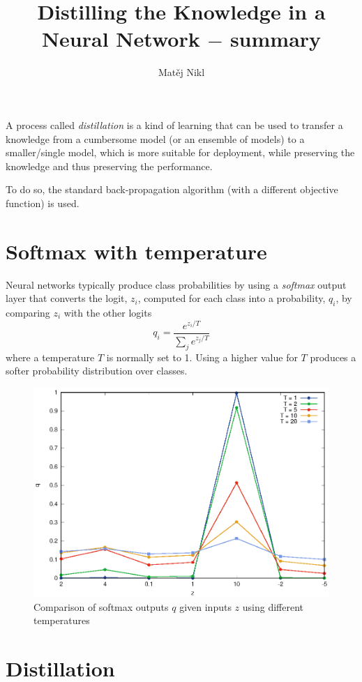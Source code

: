 \documentclass[a4paper,twocolumn]{article}
\title{Distilling the Knowledge in a Neural Network $-$ summary}
\author{Matěj Nikl}
\begin{document}
\maketitle
A process called \textit{distillation} is a kind of learning that can be used to transfer a knowledge from a cumbersome model (or an ensemble of models) to a smaller/single model, which is more suitable for deployment, while preserving the knowledge and thus preserving the performance.

To do so, the standard back-propagation algorithm (with a different objective function) is used.

\section{Softmax with temperature}
Neural networks typically produce class probabilities by using a \textit{softmax} output layer that converts the logit, $z_i$, computed for each class into a probability, $q_i$, by comparing $z_i$ with the other logits
\[
    q_i = \frac{e^{z_i/T}}{\sum_j e^{z_j/T}}
\]
where a temperature $T$ is normally set to 1. Using a higher value for $T$ produces a softer probability distribution over classes.

\begin{figure}[!h]
    \includegraphics[width=\columnwidth]{softmax_example.eps}
    \caption{Comparison of softmax outputs $q$ given inputs $z$ using different temperatures}
\end{figure}

\section{Distillation}
\end{document}
